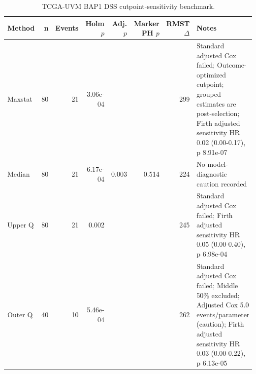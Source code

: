 \begin{table}[t]
\centering
\caption{TCGA-UVM BAP1 DSS cutpoint-sensitivity benchmark.}
\label{tab:uvm-bap1-dss-cutpoints}
\begin{tabular}{lrrrrrrl}
\toprule
Method & n & Events & Holm $p$ & Adj. $p$ & Marker PH $p$ & RMST $\Delta$ & Notes \\
\midrule
Maxstat & 80 & 21 & 3.06e-04 &  &  & 299 & Standard adjusted Cox failed; Outcome-optimized cutpoint; grouped estimates are post-selection; Firth adjusted sensitivity HR 0.02 (0.00-0.17), p 8.91e-07 \\
Median & 80 & 21 & 6.17e-04 & 0.003 & 0.514 & 224 & No model-diagnostic caution recorded \\
Upper Q & 80 & 21 & 0.002 &  &  & 245 & Standard adjusted Cox failed; Firth adjusted sensitivity HR 0.05 (0.00-0.40), p 6.98e-04 \\
Outer Q & 40 & 10 & 5.46e-04 &  &  & 262 & Standard adjusted Cox failed; Middle 50\% excluded; Adjusted Cox 5.0 events/parameter (caution); Firth adjusted sensitivity HR 0.03 (0.00-0.22), p 6.13e-05 \\
\bottomrule
\end{tabular}
\end{table}
